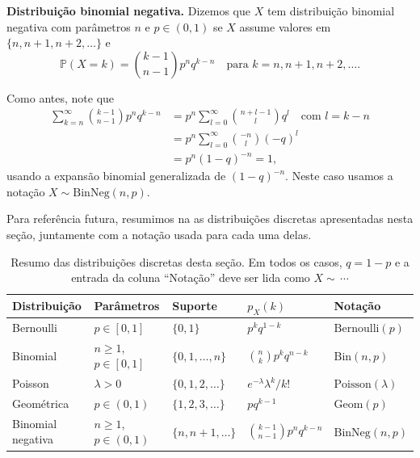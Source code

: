 \documentclass[12pt,portuguese]{article}
\let\ge\geqslant
\theoremstyle{definition}
\begin{document}
\bigskip
\noindent\textbf{Distribuição binomial negativa.} Dizemos que \(X\) tem
distribuição binomial negativa com parâmetros \(n\) e \(p \in (0, 1)\) se \(X\) assume
valores em \(\{n, n+1, n+2, \dots\}\) e
\begin{equation}\label{eq:binomial-negativa}
  \mathbb{P}(X = k) = \binom{k-1}{n-1} p^n q^{k-n} \quad \text{para }
  k = n, n+1, n+2, \dots.
\end{equation}

Como antes, note que
\[
  \begin{aligned}
    \sum_{k=n}^{\infty} \binom{k-1}{n-1} p^n q^{k-n}
      &= p^n \sum_{l=0}^{\infty} \binom{n+l-1}{l} q^l
      \quad \text{com } l = k-n \\
    &= p^n \sum_{l=0}^{\infty} \binom{-n}{l} (-q)^l \\
    &= p^n (1-q)^{-n} = 1,
  \end{aligned}
\]
usando a expansão binomial generalizada de \((1-q)^{-n}\). Neste caso usamos a
notação $X\sim \mathrm{BinNeg}(n,p)$.

Para referência futura, resumimos na  as
distribuições discretas apresentadas nesta seção, juntamente com a notação
usada para cada uma delas.

\begin{table}[H]
\centering
\footnotesize
\setlength{\tabcolsep}{12pt}
\caption{Resumo das distribuições discretas desta seção. Em todos os casos,
$q=1-p$ e a entrada da coluna ``Notação'' deve ser lida como $X\sim\,\cdots$}
\label{tab:resumo-distribuicoes}
\begin{tabular}{l l l l l}
\toprule
Distribuição & Parâmetros & Suporte & $p_X(k)$ & Notação \\
\midrule
Bernoulli & $p\in[0,1]$ & $\{0,1\}$ & $p^k q^{1-k}$ & $\mathrm{Bernoulli}(p)$ \\[0.3cm]
Binomial & $n\ge1$, $p\in[0,1]$ & $\{0,1,\dots,n\}$ & $\binom{n}{k}p^k q^{n-k}$ & $\mathrm{Bin}(n,p)$ \\[0.3cm]
Poisson & $\lambda>0$ & $\{0,1,2,\dots\}$ & $e^{-\lambda}\lambda^k/k!$ & $\mathrm{Poisson}(\lambda)$ \\[0.3cm]
Geométrica & $p\in(0,1)$ & $\{1,2,3,\dots\}$ & $p q^{k-1}$ & $\mathrm{Geom}(p)$ \\[0.3cm]
Binomial negativa & $n\ge1$, $p\in(0,1)$ & $\{n,n+1,\dots\}$ & $\binom{k-1}{n-1}p^n q^{k-n}$ & $\mathrm{BinNeg}(n,p)$ \\[0.3cm]
\bottomrule
\end{tabular}
\end{table}
\end{document}
